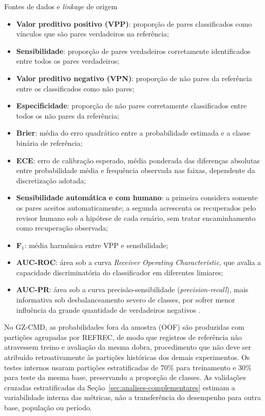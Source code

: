 \begin{chapter}{Fontes de dados e \textit{linkage} de origem}
\begin{itemize}
\item \textbf{Valor preditivo positivo (VPP)}: proporção de pares classificados como vínculos que são pares verdadeiros na referência;
\item \textbf{Sensibilidade}: proporção de pares verdadeiros corretamente identificados entre todos os pares verdadeiros;
\item \textbf{Valor preditivo negativo (VPN)}: proporção de não pares da referência entre os classificados como não pares;
\item \textbf{Especificidade}: proporção de não pares corretamente classificados entre todos os não pares da referência;
\item \textbf{Brier}: média do erro quadrático entre a probabilidade estimada e a classe binária de referência;
\item \textbf{ECE}: erro de calibração esperado, média ponderada das diferenças absolutas entre probabilidade média e frequência observada nas faixas, dependente da discretização adotada;
\item \textbf{Sensibilidade automática e com humano}: a primeira considera somente os pares aceitos automaticamente; a segunda acrescenta os recuperados pelo revisor humano sob a hipótese de cada cenário, sem tratar encaminhamento como recuperação observada;
\item \textbf{F$_1$}: média harmônica entre VPP e sensibilidade;
\item \textbf{AUC-ROC}: área sob a curva \textit{Receiver Operating Characteristic}, que avalia a capacidade discriminatória do classificador em diferentes limiares;
\item \textbf{AUC-PR}: área sob a curva precisão-sensibilidade (\textit{precision-recall}), mais informativa sob desbalanceamento severo de classes, por sofrer menor influência da grande quantidade de verdadeiros negativos \cite{He2009imbalanced,Saito2015aucpr}.
\end{itemize}

No GZ-CMD, as probabilidades fora da amostra (OOF) são produzidas com partições agrupadas por REFREC, de modo que registros de referência não atravessem treino e avaliação da mesma dobra, procedimento que não deve ser atribuído retroativamente às partições históricas dos demais experimentos. Os testes internos usaram partições estratificadas de 70\% para treinamento e 30\% para teste da mesma base, preservando a proporção de classes. As validações cruzadas estratificadas da Seção~\ref{sec:analises-complementares} estimam a variabilidade interna das métricas, não a transferência do desempenho para outra base, população ou período.


\end{chapter}
